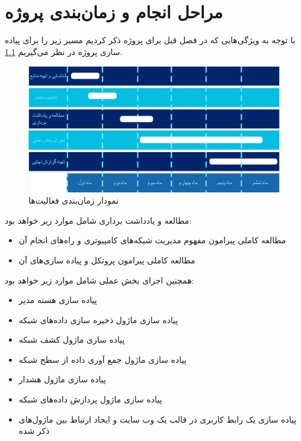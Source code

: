 \chapter{مراحل انجام و زمان‌بندی پروژه}

با توجه به ویژگی‌هایی که در فصل قبل برای پروژه ذکر کردیم مسیر زیر را برای پیاده سازی پروژه در نظر می‌گیریم \cref{fig.22}.

\begin{figure}[!h]
\centering\includegraphics[scale=.55]{./timeline2}
\caption{نمودار زمان‌بندی فعالیت‌ها}\label{fig.22}
\end{figure}
مطالعه و یادداشت برداری شامل موارد زیر خواهد بود:



\begin{itemize}
    \addtolength{\itemindent}{0.6cm}
    \item مطالعه کاملی پیرامون مفهوم مدیریت شبکه‌های کامپیوتری و راه‌های انجام آن
    \item مطالعه کاملی پیرامون پروتکل  و پیاده سازی‌های آن
\end{itemize}



همچنین اجرای بخش عملی شامل موارد زیر خواهد بود:



\begin{itemize}
    \addtolength{\itemindent}{0.6cm}
    \item پیاده سازی هسته مدیر 
    \item پیاده سازی ماژول ذخیره سازی داده‌های شبکه 
    \item پیاده سازی ماژول کشف شبکه 
    \item پیاده سازی ماژول جمع آوری داده از سطح شبکه 
    \item پیاده سازی ماژول هشدار 
    \item پیاده سازی ماژول پردازش داده‌های شبکه
    \item پیاده سازی یک رابط کاربری در قالب یک وب سایت و ایجاد ارتباط بین ماژول‌های ذکر شده
\end{itemize}
